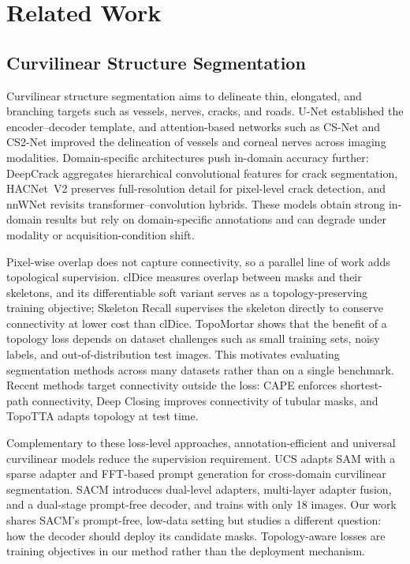 \section{Related Work}
\label{sec:related}

\subsection{Curvilinear Structure Segmentation}
\label{sec:related_css}

Curvilinear structure segmentation aims to delineate thin, elongated, and
branching targets such as vessels, nerves, cracks, and roads. U-Net
\cite{ronneberger2015unet} established the encoder--decoder template, and
attention-based networks such as CS-Net \cite{mou2019csnet} and CS2-Net
\cite{mou2021cs2net} improved the delineation of vessels and
corneal nerves across imaging modalities. Domain-specific architectures push
in-domain accuracy further: DeepCrack \cite{liu2019deepcrack} aggregates
hierarchical convolutional features for crack segmentation, HACNet~V2
\cite{chen2025hacnetv2} preserves full-resolution detail for pixel-level
crack detection, and nnWNet \cite{zhou2025nnwnet} revisits
transformer--convolution hybrids. These models obtain strong in-domain results
but rely on domain-specific annotations and can degrade under modality or
acquisition-condition shift.

Pixel-wise overlap does not capture connectivity, so a parallel line of work
adds topological supervision. clDice \cite{shit2021cldice} measures overlap
between masks and their skeletons, and its differentiable soft variant serves
as a topology-preserving training objective; Skeleton Recall
\cite{kirchhoff2024skeletonrecall} supervises the skeleton directly to
conserve connectivity at lower cost than clDice. TopoMortar
\cite{valverde2025topomortar} shows that the benefit of a topology loss
depends on dataset challenges such as small training sets, noisy labels, and
out-of-distribution test images. This motivates evaluating segmentation
methods across many datasets rather than on a single benchmark. Recent methods
target connectivity outside the loss: CAPE \cite{esmaeilzadeh2025cape} enforces
shortest-path connectivity, Deep Closing \cite{wu2024deepclosing} improves
connectivity of tubular masks, and TopoTTA \cite{zhou2025topotta} adapts
topology at test time.

Complementary to these loss-level approaches, annotation-efficient and universal
curvilinear models reduce the supervision requirement. UCS \cite{zhu2025ucs}
adapts SAM with a sparse adapter and
FFT-based prompt generation for cross-domain curvilinear segmentation. SACM
\cite{zhu2026sacm} introduces dual-level adapters, multi-layer adapter
fusion, and a dual-stage prompt-free decoder, and trains with only 18 images.
Our work shares SACM's prompt-free, low-data setting but studies a different
question: how the decoder should deploy its candidate masks. Topology-aware
losses are training objectives in our method rather than the deployment
mechanism.

